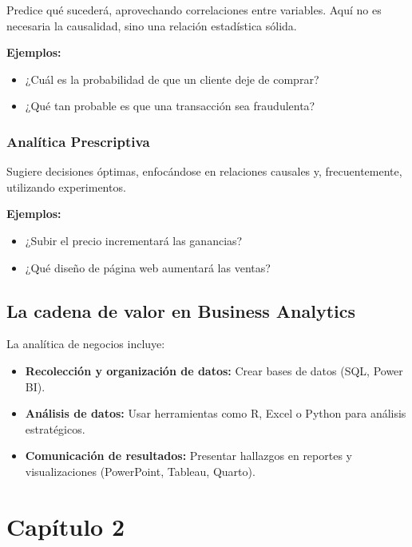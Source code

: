 \documentclass[
  spanish,
  letterpaper,
  DIV=11,
  numbers=noendperiod]{scrreprt}
\providecommand{\tightlist}{%
  \setlength{\itemsep}{0pt}\setlength{\parskip}{0pt}}
\begin{document}
Predice qué sucederá, aprovechando correlaciones entre variables. Aquí
no es necesaria la causalidad, sino una relación estadística sólida.

\textbf{Ejemplos:}

\begin{itemize}
\tightlist
\item
  ¿Cuál es la probabilidad de que un cliente deje de comprar?
\item
  ¿Qué tan probable es que una transacción sea fraudulenta?
\end{itemize}

\subsection{Analítica Prescriptiva}\label{analuxedtica-prescriptiva}

Sugiere decisiones óptimas, enfocándose en relaciones causales y,
frecuentemente, utilizando experimentos.

\textbf{Ejemplos:}

\begin{itemize}
\tightlist
\item
  ¿Subir el precio incrementará las ganancias?
\item
  ¿Qué diseño de página web aumentará las ventas?
\end{itemize}

\section{La cadena de valor en Business
Analytics}\label{la-cadena-de-valor-en-business-analytics}

La analítica de negocios incluye:

\begin{itemize}
\tightlist
\item
  \textbf{Recolección y organización de datos:} Crear bases de datos
  (SQL, Power BI).
\item
  \textbf{Análisis de datos:} Usar herramientas como R, Excel o Python
  para análisis estratégicos.
\item
  \textbf{Comunicación de resultados:} Presentar hallazgos en reportes y
  visualizaciones (PowerPoint, Tableau, Quarto).
\end{itemize}


\chapter{Capítulo 2}\label{capuxedtulo-2}
\end{document}
